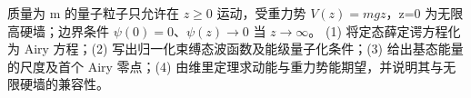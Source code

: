 质量为 m 的量子粒子只允许在 \(z\ge0\) 运动，受重力势 \(V(z)=mgz\)，z=0 为无限高硬墙；边界条件 \(\psi(0)=0\)、\(\psi(z)\to0\) 当 \(z\to \infty \)。
(1) 将定态薛定谔方程化为 Airy 方程；(2) 写出归一化束缚态波函数及能级量子化条件；(3) 给出基态能量的尺度及首个 Airy 零点；(4) 由维里定理求动能与重力势能期望，并说明其与无限硬墙的兼容性。

